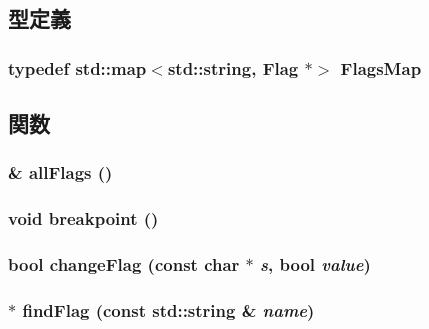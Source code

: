 \subsection{型定義}
\hypertarget{namespaceDebug_a5c634388b87790d313916f2477673979}{
\subsubsection[{FlagsMap}]{\setlength{\rightskip}{0pt plus 5cm}typedef std::map$<$std::string, {\bf Flag} $\ast$$>$ {\bf FlagsMap}}}
\label{namespaceDebug_a5c634388b87790d313916f2477673979}


\subsection{関数}
\hypertarget{namespaceDebug_ad113f4869bfc4806ae29d67a84446683}{
\subsubsection[{allFlags}]{ \& allFlags ()}}
\label{namespaceDebug_ad113f4869bfc4806ae29d67a84446683}
\hypertarget{namespaceDebug_a874043e2396dd8ce20ec7af3ea1e2a86}{
\subsubsection[{breakpoint}]{\setlength{\rightskip}{0pt plus 5cm}void breakpoint ()}}
\label{namespaceDebug_a874043e2396dd8ce20ec7af3ea1e2a86}
\hypertarget{namespaceDebug_a0a79963bb41b5f1201bc625a735ad1de}{
\subsubsection[{changeFlag}]{\setlength{\rightskip}{0pt plus 5cm}bool changeFlag (const char $\ast$ {\em s}, \/  bool {\em value})}}
\label{namespaceDebug_a0a79963bb41b5f1201bc625a735ad1de}
\hypertarget{namespaceDebug_a49937a47d69d0ae4a3627b2097f829fa}{
\subsubsection[{findFlag}]{ $\ast$ findFlag (const std::string \& {\em name})}}
\label{namespaceDebug_a49937a47d69d0ae4a3627b2097f829fa}


